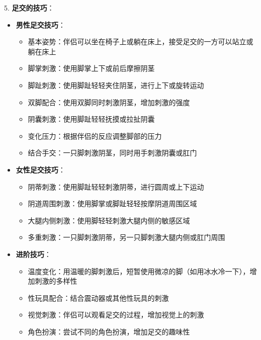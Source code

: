 \documentclass[12pt,UTF8]{ctexbook}
\begin{document}
5. \textbf{足交的技巧}：
\begin{itemize}
	\item \textbf{男性足交技巧}：
	\begin{itemize}
		\item 基本姿势：伴侣可以坐在椅子上或躺在床上，接受足交的一方可以站立或躺在床上
		\item 脚掌刺激：使用脚掌上下或前后摩擦阴茎
		\item 脚趾刺激：使用脚趾轻轻夹住阴茎，进行上下或旋转运动
		\item 双脚配合：使用双脚同时刺激阴茎，增加刺激的强度
		\item 阴囊刺激：使用脚趾轻轻抚摸或拉扯阴囊
		\item 变化压力：根据伴侣的反应调整脚部的压力
		\item 结合手交：一只脚刺激阴茎，同时用手刺激阴囊或肛门
	\end{itemize}
	\item \textbf{女性足交技巧}：
	\begin{itemize}
		\item 阴蒂刺激：使用脚趾轻轻刺激阴蒂，进行圆周或上下运动
		\item 阴道周围刺激：使用脚掌或脚趾轻轻按摩阴道周围区域
		\item 大腿内侧刺激：使用脚轻轻刺激大腿内侧的敏感区域
		\item 多重刺激：一只脚刺激阴蒂，另一只脚刺激大腿内侧或肛门周围
	\end{itemize}
	\item \textbf{进阶技巧}：
	\begin{itemize}
		\item 温度变化：用温暖的脚刺激后，短暂使用微凉的脚（如用冰水冷一下），增加刺激的多样性
		\item 性玩具配合：结合震动器或其他性玩具的刺激
		\item 视觉刺激：伴侣可以观看足交的过程，增加视觉上的刺激
		\item 角色扮演：尝试不同的角色扮演，增加足交的趣味性
	\end{itemize}
\end{itemize}
\end{document}
